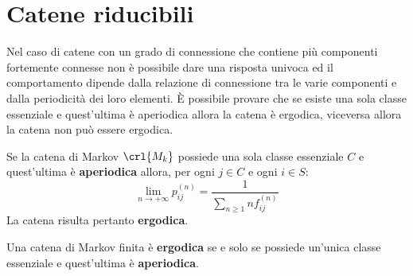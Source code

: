 \documentclass[\main/main.tex]{subfiles}
\begin{document}
\section{Catene riducibili}
Nel caso di catene con un grado di connessione che contiene più componenti fortemente connesse non è possibile dare una risposta univoca ed il comportamento dipende dalla relazione di connessione tra le varie componenti e dalla periodicità dei loro elementi. È possibile provare che se esiste una sola classe essenziale e quest'ultima è aperiodica allora la catena è ergodica, viceversa allora la catena non può essere ergodica.

\begin{theorem}
  Se la catena di Markov \(\crl{M_k}\) possiede una sola classe essenziale \(C\) e quest'ultima è \textbf{aperiodica} allora, per ogni \(j \in C\) e ogni \(i \in S\):
  \[
    \lim_{n\rightarrow+\infty} p^{(n)}_{ij} = \frac{1}{\sum_{n\geq 1} n f^{(n)}_{ij}}
  \]
  La catena risulta pertanto \textbf{ergodica}.
\end{theorem}

\begin{theorem}
  Una catena di Markov finita è \textbf{ergodica} se e solo se possiede un'unica classe essenziale e quest'ultima è \textbf{aperiodica}.
\end{theorem}
\end{document}

